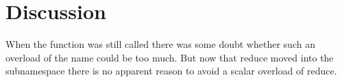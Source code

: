 \section{Discussion}

When the function was still called 
there was some doubt whether such an overload of the name could be too much.
But now that reduce moved into the subnamespace 
there is no apparent reason to avoid a scalar overload of reduce.




